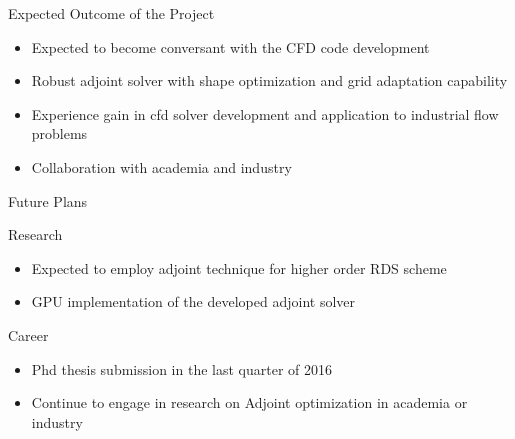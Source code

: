 \begin{frame}{Expected Outcome of the Project}
\begin{block}{}
\begin{itemize}
\item Expected to become conversant with the CFD code development
\item Robust adjoint solver with shape optimization and grid adaptation capability
\item Experience gain in cfd solver development and application to industrial flow problems
\item Collaboration with academia and industry
\end{itemize}
\end{block}
\end{frame}


\begin{frame}{Future Plans}
\begin{block}{Research}
\begin{itemize}
\item Expected to employ adjoint technique for higher order RDS scheme
\item GPU implementation of the developed adjoint solver
\end{itemize}
\end{block}
\begin{block}{Career}
\begin{itemize}
\item Phd thesis submission in the last quarter of 2016
\item Continue to engage in research on Adjoint optimization in academia or industry

\end{itemize}
\end{block}
\end{frame}




%

